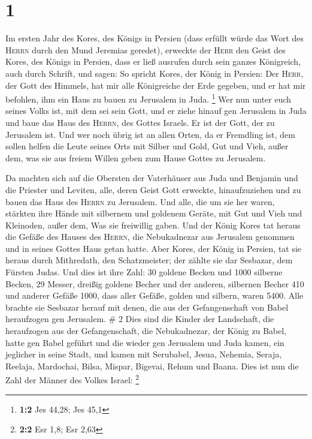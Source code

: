\hypertarget{section}{%
\section{1}\label{section}}

 Im ersten Jahr des Kores, des Königs in Persien (dass
erfüllt würde das Wort des \textsc{Herrn} durch den Mund Jeremias
geredet), erweckte der \textsc{Herr} den Geist des Kores, des Königs in
Persien, dass er ließ ausrufen durch sein ganzes Königreich, auch durch
Schrift, und sagen:  So spricht Kores, der König in
Persien: Der \textsc{Herr}, der Gott des Himmels, hat mir alle
Königreiche der Erde gegeben, und er hat mir befohlen, ihm ein Haus zu
bauen zu Jerusalem in Juda. \footnote{\textbf{1:2} Jes 44,28; Jes 45,1}
 Wer nun unter euch seines Volks ist, mit dem sei sein
Gott, und er ziehe hinauf gen Jerusalem in Juda und baue das Haus des
\textsc{Herrn}, des Gottes Israels. Er ist der Gott, der zu Jerusalem
ist.  Und wer noch übrig ist an allen Orten, da er
Fremdling ist, dem sollen helfen die Leute seines Orts mit Silber und
Gold, Gut und Vieh, außer dem, was sie aus freiem Willen geben zum Hause
Gottes zu Jerusalem.

 Da machten sich auf die Obersten der Vaterhäuser aus Juda
und Benjamin und die Priester und Leviten, alle, deren Geist Gott
erweckte, hinaufzuziehen und zu bauen das Haus des \textsc{Herrn} zu
Jerusalem.  Und alle, die um sie her waren, stärkten ihre
Hände mit silbernem und goldenem Geräte, mit Gut und Vieh und Kleinoden,
außer dem, Was sie freiwillig gaben.  Und der König Kores
tat heraus die Gefäße des Hauses des \textsc{Herrn}, die Nebukadnezar
aus Jerusalem genommen und in seines Gottes Haus getan hatte.
 Aber Kores, der König in Persien, tat sie heraus durch
Mithredath, den Schatzmeister; der zählte sie dar Sesbazar, dem Fürsten
Judas.  Und dies ist ihre Zahl: 30 goldene Becken und 1000
silberne Becken, 29 Messer,  dreißig goldene Becher und
der anderen, silbernen Becher 410 und anderer Gefäße 1000,
 dass aller Gefäße, golden und silbern, waren 5400. Alle
brachte sie Sesbazar herauf mit denen, die aus der Gefangenschaft von
Babel heraufzogen gen Jerusalem. \# 2  Dies sind die
Kinder der Landschaft, die heraufzogen aus der Gefangenschaft, die
Nebukadnezar, der König zu Babel, hatte gen Babel geführt und die wieder
gen Jerusalem und Juda kamen, ein jeglicher in seine Stadt,
 und kamen mit Serubabel, Jesua, Nehemia, Seraja, Reelaja,
Mardochai, Bilsa, Mispar, Bigevai, Rehum und Baana. Dies ist nun die
Zahl der Männer des Volkes Israel: \footnote{\textbf{2:2} Esr 1,8; Esr
  2,63}

